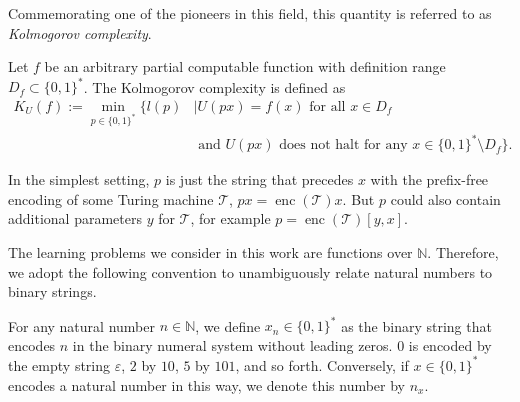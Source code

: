 Commemorating one of the pioneers in this field, this quantity is referred to as \textit{Kolmogorov complexity}.
\begin{definition}
	\label{def:kolmogorov-complexity}
	Let $f$ be an arbitrary partial computable function with definition range $D_f\subset\{0,1\}^{*}$.
	The Kolmogorov complexity is defined as
	\begin{align}
		\label{eq:kolmogorov-complexity}
		K_U(f):=\min_{p\in\{0,1\}^{*}}\{l(p)&\mid U(px)=f(x) \text{ for all } x\in D_f \\
		&\text{ and } U(px) \text{ does not halt for any }x\in\{0,1\}^{*}\setminus D_f\}.
	\end{align}
\end{definition}
In the simplest setting, $p$ is just the string that precedes $x$ with the prefix-free encoding of some Turing machine $\mathcal{T}$, $px=\operatorname{enc}(\mathcal{T})x$.
But $p$ could also contain additional parameters $y$ for $\mathcal{T}$, for example $p=\operatorname{enc}(\mathcal{T})[y,x]$.

The learning problems we consider in this work are functions over $\mathbb{N}$.
Therefore, we adopt the following convention to unambiguously relate natural numbers to binary strings.
\begin{definition}
	\label{def:natural-numbers-binary-strings-encoding}
	For any natural number $n\in\mathbb{N}$, we define $x_n\in\{0,1\}^{*}$ as the binary string that encodes $n$ in the binary numeral system without leading zeros.
	$0$ is encoded by the empty string $\varepsilon$, $2$ by $10$, $5$ by $101$, and so forth.
	Conversely, if $x\in\{0,1\}^{*}$ encodes a natural number in this way, we denote this number by $n_x$. 
\end{definition}

